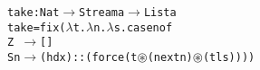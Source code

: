 \begin{alltt}
take : Nat \(\rightarrow\) Stream a \(\rightarrow\) List a
take = fix(\(\lambda\)t.\(\lambda\)n.\(\lambda\)s. case n of
                              Z   \,\(\rightarrow\) []
                              S n \(\rightarrow\) (hd x) :: (force (t \(\circledast\) (next n) \(\circledast\) (tl s))))
\end{alltt}
